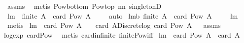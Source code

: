 \begin{isabellebody}
%
\isatagproof
{}\isamarkupfalse%
\ assms\ \isanewline
{}\isamarkupfalse%
\ {\isacharparenleft}metis\ Pow{\isacharunderscore}bottom\ Pow{\isacharunderscore}top\ nn{}{}\ singletonD{\isacharparenright}%
\endisatagproof
{\isafoldproof}%
%
\isadelimproof
%
\endisadelimproof
\isanewline
\isanewline
{}\isamarkupfalse%
\ lm{}{}{}{\isacharcolon}\ {\isachardoublequoteopen}{\isacharparenleft}{\isasymnot}\ {\isacharparenleft}finite\ A{\isacharparenright}{\isacharparenright}\ {\isacharequal}\ {\isacharparenleft}card\ {\isacharparenleft}Pow\ A{\isacharparenright}\ {\isacharequal}\ {}{\isacharparenright}{\isachardoublequoteclose}%
\isadelimproof
\ %
\endisadelimproof
%
\isatagproof
{}\isamarkupfalse%
\ auto%
\endisatagproof
{\isafoldproof}%
%
\isadelimproof
%
\endisadelimproof
\isanewline
\isanewline
{}\isamarkupfalse%
\ lm{}{}{}b{\isacharcolon}\ {\isachardoublequoteopen}{\isacharparenleft}finite\ A{\isacharparenright}\ {\isacharequal}\ {\isacharparenleft}card\ {\isacharparenleft}Pow\ A{\isacharparenright}\ {\isasymnoteq}\ {}{\isacharparenright}{\isachardoublequoteclose}%
\isadelimproof
\ %
\endisadelimproof
%
\isatagproof
{}\isamarkupfalse%
\ lm{}{}{}\ \isamarkupfalse%
\ metis%
\endisatagproof
{\isafoldproof}%
%
\isadelimproof
%
\endisadelimproof
\isanewline
\isanewline
{}\isamarkupfalse%
\ lm{}{}{}{\isacharcolon}\ \ {\isachardoublequoteopen}card\ {\isacharparenleft}Pow\ A{\isacharparenright}\ {\isasymnoteq}\ {}{\isachardoublequoteclose}\ \ {\isachardoublequoteopen}card\ A{\isacharequal}Discrete{\isachardot}log\ {\isacharparenleft}card\ {\isacharparenleft}Pow\ A{\isacharparenright}{\isacharparenright}{\isachardoublequoteclose}%
\isadelimproof
\ %
\endisadelimproof
%
\isatagproof
{}\isamarkupfalse%
\ assms\ \isanewline
log{\isacharunderscore}exp\ card{\isacharunderscore}Pow\ \isamarkupfalse%
\ {\isacharparenleft}metis\ card{\isacharunderscore}infinite\ finite{\isacharunderscore}Pow{\isacharunderscore}iff{\isacharparenright}%
\endisatagproof
{\isafoldproof}%
%
\isadelimproof
%
\endisadelimproof
\isanewline
\isanewline
{}\isamarkupfalse%
\ lm{}{}{}{\isacharcolon}\ \ {\isachardoublequoteopen}card\ {\isacharparenleft}Pow\ A{\isacharparenright}{\isacharequal}{}{\isachardoublequoteclose}\ \ {\isachardoublequoteopen}card\ A{\isacharequal}{}{\isachardoublequoteclose}%

\end{isabellebody}
